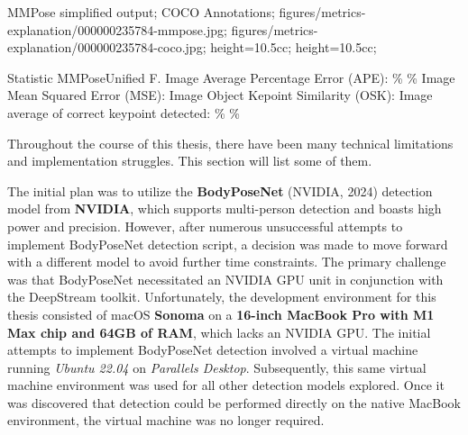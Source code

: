     {
        MMPose simplified output;
        COCO Annotations;
    }
    {
        figures/metrics-explanation/000000235784-mmpose.jpg;
        figures/metrics-explanation/000000235784-coco.jpg;
    }
    {
        height=10.5cc;
        height=10.5cc;
    }


    \setupTABLE[r][1][style=bold]
    \setupTABLE[c][each][offset=3dd]
    \setupTABLE[frame=off]
    \setupTABLE[r][1][topframe=on,bottomframe=on]
    \setupTABLE[c][each][leftframe=on]
    \setupTABLE[c][1][leftframe=off]
    \setupTABLE[c][2,3][align=middle]
    \bTR\bTD Statistic                                   \eTD\bTD    MMPose\eTD\bTD     Unified F.\eTD\eTR
    \bTR\bTD Image Average Percentage Error (APE):       \eTD{}\% \eTD{}\% \eTD\eTR
    \bTR\bTD Image Mean Squared Error (MSE):             \eTD{} \eTD{} \eTD\eTR
    \bTR\bTD Image Object Kepoint Similarity (OSK):      \eTD{} \eTD{} \eTD\eTR
    \bTR\bTD Image average of correct keypoint detected: \eTD{}\% \eTD{}\% \eTD\eTR

Throughout the course of this thesis, there have been many technical limitations and implementation struggles. This section will list some of them.

The initial plan was to utilize the {\bf BodyPoseNet} (NVIDIA, 2024) detection model from {\bf NVIDIA}, which supports multi-person detection and boasts high power and precision. However, after numerous unsuccessful attempts to implement BodyPoseNet detection script, a decision was made to move forward with a different model to avoid further time constraints. The primary challenge was that BodyPoseNet necessitated an NVIDIA GPU unit in conjunction with the DeepStream toolkit. Unfortunately, the development environment for this thesis consisted of macOS {\bf Sonoma} on a {\bf 16-inch MacBook Pro with M1 Max chip and 64GB of RAM}, which lacks an NVIDIA GPU. The initial attempts to implement BodyPoseNet detection involved a virtual machine running {\em Ubuntu 22.04} on {\em Parallels Desktop}. Subsequently, this same virtual machine environment was used for all other detection models explored. Once it was discovered that detection could be performed directly on the native MacBook environment, the virtual machine was no longer required.

